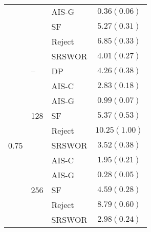\begin{tabular}{lllc}
                         &                      & AIS-G     & $0.36(0.06)$            \\
                         &                      & SF        & $5.27(0.31)$            \\
                         &                      & Reject    & $6.85(0.33)$            \\
                         &                      & SRSWOR    & $4.01(0.27)$            \\
  \midrule
  \multirow{11}{*}{0.75} & \multirow{1}{*}{--}  & DP        & $4.26(0.38)$            \\
  \cmidrule{2-4}
                         & \multirow{5}{*}{128} & AIS-C     & $2.83(0.18)$            \\
                         &                      & AIS-G     & $0.99(0.07)$            \\
                         &                      & SF        & $5.37(0.53)$            \\
                         &                      & Reject    & $10.25(1.00)$           \\
                         &                      & SRSWOR    & $3.52(0.38)$            \\
  \cmidrule{2-4}
                         & \multirow{5}{*}{256} & AIS-C     & $1.95(0.21)$            \\
                         &                      & AIS-G     & $0.28(0.05)$            \\
                         &                      & SF        & $4.59(0.28)$            \\
                         &                      & Reject    & $8.79(0.60)$            \\
                         &                      & SRSWOR    & $2.98(0.24)$            \\
  \bottomrule
\end{tabular}
